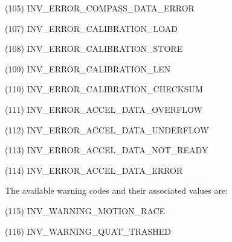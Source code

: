 \begin{DoxyItemize}
\item (105) I\+N\+V\+\_\+\+E\+R\+R\+O\+R\+\_\+\+C\+O\+M\+P\+A\+S\+S\+\_\+\+D\+A\+T\+A\+\_\+\+E\+R\+R\+O\+R
\item (107) I\+N\+V\+\_\+\+E\+R\+R\+O\+R\+\_\+\+C\+A\+L\+I\+B\+R\+A\+T\+I\+O\+N\+\_\+\+L\+O\+A\+D
\item (108) I\+N\+V\+\_\+\+E\+R\+R\+O\+R\+\_\+\+C\+A\+L\+I\+B\+R\+A\+T\+I\+O\+N\+\_\+\+S\+T\+O\+R\+E
\item (109) I\+N\+V\+\_\+\+E\+R\+R\+O\+R\+\_\+\+C\+A\+L\+I\+B\+R\+A\+T\+I\+O\+N\+\_\+\+L\+E\+N
\item (110) I\+N\+V\+\_\+\+E\+R\+R\+O\+R\+\_\+\+C\+A\+L\+I\+B\+R\+A\+T\+I\+O\+N\+\_\+\+C\+H\+E\+C\+K\+S\+U\+M
\item (111) I\+N\+V\+\_\+\+E\+R\+R\+O\+R\+\_\+\+A\+C\+C\+E\+L\+\_\+\+D\+A\+T\+A\+\_\+\+O\+V\+E\+R\+F\+L\+O\+W
\item (112) I\+N\+V\+\_\+\+E\+R\+R\+O\+R\+\_\+\+A\+C\+C\+E\+L\+\_\+\+D\+A\+T\+A\+\_\+\+U\+N\+D\+E\+R\+F\+L\+O\+W
\item (113) I\+N\+V\+\_\+\+E\+R\+R\+O\+R\+\_\+\+A\+C\+C\+E\+L\+\_\+\+D\+A\+T\+A\+\_\+\+N\+O\+T\+\_\+\+R\+E\+A\+D\+Y
\item (114) I\+N\+V\+\_\+\+E\+R\+R\+O\+R\+\_\+\+A\+C\+C\+E\+L\+\_\+\+D\+A\+T\+A\+\_\+\+E\+R\+R\+O\+R
\end{DoxyItemize}

The available warning codes and their associated values are\+:
\begin{DoxyItemize}
\item (115) I\+N\+V\+\_\+\+W\+A\+R\+N\+I\+N\+G\+\_\+\+M\+O\+T\+I\+O\+N\+\_\+\+R\+A\+C\+E
\item (116) I\+N\+V\+\_\+\+W\+A\+R\+N\+I\+N\+G\+\_\+\+Q\+U\+A\+T\+\_\+\+T\+R\+A\+S\+H\+E\+D 
\end{DoxyItemize}